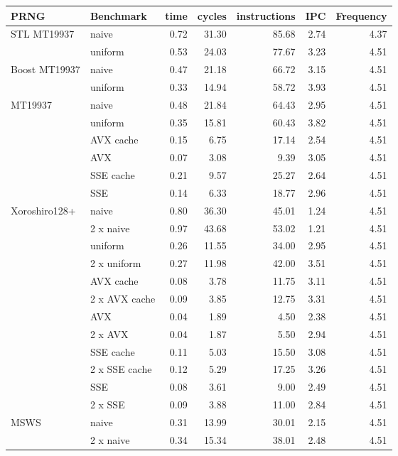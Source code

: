\documentclass{stdlocal}
\begin{document}
\begin{tabular}{llrrrrr}
  \hline
  \textbf{PRNG} & \textbf{Benchmark} & time & cycles & instructions & IPC & Frequency\\
  \hline
  \hline
  \multirow{2}{*}{STL MT19937}
  & naive &  0.72 &  31.30  & 85.68 &  2.74 & 4.37 \\
  & uniform & 0.53 & 24.03 & 77.67 & 3.23 & 4.51 \\
  \hline
  \multirow{2}{*}{Boost MT19937}
  & naive & 0.47 & 21.18 & 66.72 & 3.15 & 4.51 \\
  & uniform & 0.33 & 14.94 & 58.72 & 3.93 & 4.51 \\
  \hline
  \multirow{6}{*}{MT19937}
  & naive & 0.48 & 21.84 & 64.43 & 2.95 & 4.51 \\
  & uniform & 0.35 & 15.81 & 60.43 & 3.82 & 4.51 \\
  & AVX cache & 0.15 & 6.75 & 17.14 & 2.54 & 4.51 \\
  & AVX & 0.07 & 3.08 & 9.39 & 3.05 & 4.51 \\
  & SSE cache & 0.21 & 9.57 & 25.27 & 2.64 & 4.51 \\
  & SSE & 0.14 & 6.33 & 18.77 & 2.96 & 4.51 \\
  \hline
  \multirow{12}{*}{Xoroshiro128+}
  & naive & 0.80 & 36.30 & 45.01 & 1.24 & 4.51 \\
  & 2 x naive & 0.97 & 43.68 & 53.02 & 1.21 & 4.51 \\
  & uniform & 0.26 & 11.55 & 34.00 & 2.95 & 4.51 \\
  & 2 x uniform & 0.27 & 11.98 & 42.00 & 3.51 & 4.51 \\
  & AVX cache & 0.08 & 3.78 & 11.75 & 3.11 & 4.51 \\
  & 2 x AVX cache & 0.09 & 3.85 & 12.75 & 3.31 & 4.51 \\
  & AVX & 0.04 & 1.89 & 4.50 & 2.38 & 4.51 \\
  & 2 x AVX & 0.04 & 1.87 & 5.50 & 2.94 & 4.51 \\
  & SSE cache & 0.11 & 5.03 & 15.50 & 3.08 & 4.51 \\
  & 2 x SSE cache & 0.12 & 5.29 & 17.25 & 3.26 & 4.51 \\
  & SSE & 0.08 & 3.61 & 9.00 & 2.49 & 4.51 \\
  & 2 x SSE & 0.09 & 3.88 & 11.00 & 2.84 & 4.51 \\
  \hline
  \multirow{12}{*}{MSWS}
  & naive & 0.31 & 13.99 & 30.01 & 2.15 & 4.51 \\
  & 2 x naive & 0.34 & 15.34 & 38.01 & 2.48 & 4.51 \\

\end{tabular}
\end{document}
